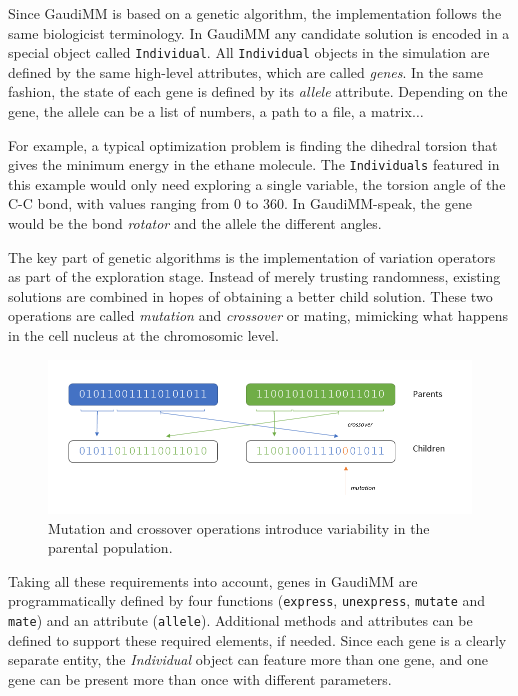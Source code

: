 Since GaudiMM is based on a genetic algorithm, the implementation follows the same biologicist terminology. In GaudiMM any candidate solution is encoded in a special object called \texttt{Individual}. All \texttt{Individual} objects in the simulation are defined by the same high-level attributes, which are called \textit{genes}. In the same fashion, the state of each gene is defined by its \textit{allele} attribute. Depending on the gene, the allele can be a list of numbers, a path to a file, a matrix$ \ldots $

For example, a typical optimization problem is finding the dihedral torsion that gives the minimum energy in the ethane molecule. The \texttt{Individuals} featured in this example would only need exploring a single variable, the torsion angle of the C-C bond, with values ranging from 0 to 360\textdegree. In GaudiMM-speak, the gene would be the bond \textit{rotator} and the allele the different angles.

The key part of genetic algorithms is the implementation of variation operators as part of the exploration stage. Instead of merely trusting randomness, existing solutions are combined in hopes of obtaining a better child solution. These two operations are called \textit{mutation} and \textit{crossover} or mating, mimicking what happens in the cell nucleus at the chromosomic level.


\begin{figure}[H] %
	\includegraphics[width=\textwidth]{./figures/04/ga-crossover-mut.png}
	\caption[Mutation and crossover]{Mutation and crossover operations introduce variability in the parental population.}
	\label{fig:cxmut}
\end{figure}

Taking all these requirements into account, genes in GaudiMM are programmatically defined by four functions (\texttt{express}, \texttt{unexpress}, \texttt{mutate} and \texttt{mate}) and an attribute (\texttt{allele}). Additional methods and attributes can be defined to support these required elements, if needed. Since each gene is a clearly separate entity, the \textit{Individual} object can feature more than one gene, and one gene can be present more than once with different parameters.

